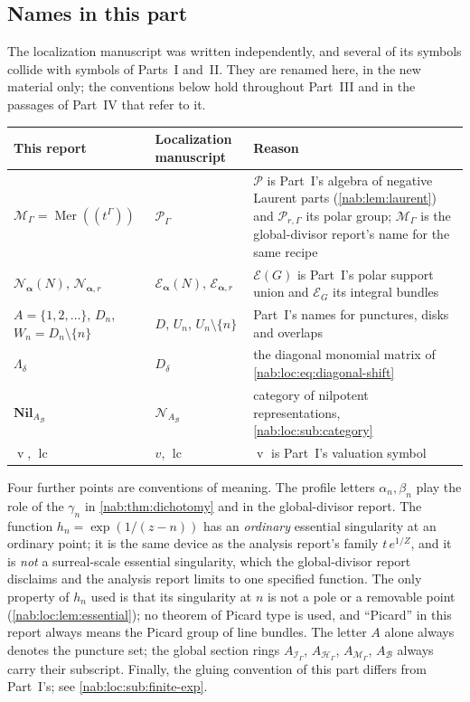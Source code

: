 \documentclass[11pt,letterpaper]{article}
\theoremstyle{definition}
\theoremstyle{remark}
\newcommand{\HH}{\mathscr H_\Gamma}
\newcommand{\II}{\mathscr I_\Gamma}
\newcommand{\val}{\operatorname{v}}
\newcommand{\PP}{\mathcal P}
\newcommand{\EU}{\mathcal E}
\newcommand{\MM}{\mathscr M_\Gamma}
\newcommand{\BB}{\mathscr B}
\newcommand{\Aglob}{A_{\BB}}
\newcommand{\Mer}{\operatorname{Mer}}
\newcommand{\lc}{\operatorname{lc}}
\newcommand{\Nil}{\mathbf{Nil}}
\newcommand{\profile}{\boldsymbol\alpha}
\newcommand{\NN}[1]{\mathcal N_{\profile,#1}}
\numberwithin{equation}{section}
\begin{document}
\subsection{Names in this part}\label{nab:loc:sub:names}

The localization manuscript was written independently, and several of its
symbols collide with symbols of Parts~I and~II. They are renamed here, in the
new material only; the conventions below hold throughout Part~III and in the
passages of Part~IV that refer to it.

\begin{center}\small
\begin{tabular}{@{}L{0.25\textwidth}L{0.2\textwidth}L{0.45\textwidth}@{}}
\toprule
This report & Localization manuscript & Reason\\
\midrule
$\MM=\Mer((t^\Gamma))$ & $\mathscr P_\Gamma$ &
$\PP$ is Part~I's algebra of negative Laurent parts (\cref{nab:lem:laurent})
and $\mathscr P_{r,\Gamma}$ its polar group; $\mathscr M_\Gamma$ is the
global-divisor report's name for the same recipe\\[0.3em]
$\mathcal N_{\profile}(N)$, $\NN r$ & $\mathcal E_{\profile}(N)$,
$\mathcal E_{\profile,r}$ &
$\EU(G)$ is Part~I's polar support union and $\mathcal E_G$ its integral
bundles\\[0.3em]
$A=\{1,2,\ldots\}$, $D_n$, $W_n=D_n\setminus\{n\}$ & $D$, $U_n$,
$U_n\setminus\{n\}$ & Part~I's names for punctures, disks and overlaps\\[0.3em]
$\Lambda_\delta$ & $D_\delta$ & the diagonal monomial matrix of
\eqref{nab:loc:eq:diagonal-shift}\\[0.3em]
$\Nil_{\Aglob}$ & $\mathcal N_{\Aglob}$ & category of nilpotent
representations, \cref{nab:loc:sub:category}\\[0.3em]
$\val$, $\lc$ & $v$, $\operatorname{lc}$ & $\val$ is Part~I's valuation symbol\\
\bottomrule
\end{tabular}
\end{center}

Four further points are conventions of meaning. The profile letters
$\alpha_n,\beta_n$ play the role of the $\gamma_n$ in \cref{nab:thm:dichotomy}
and in the global-divisor report. The function $h_n=\exp(1/(z-n))$ has an
\emph{ordinary} essential singularity at an ordinary point; it is the same
device as the analysis report's family $t\,e^{1/Z}$, and it is \emph{not} a
surreal-scale essential singularity, which the global-divisor report
disclaims and the analysis report limits to one specified function. The only
property of $h_n$ used is that its singularity at $n$ is not a pole or a
removable point (\cref{nab:loc:lem:essential}); no theorem of Picard type is
used, and ``Picard'' in this report always means the Picard group of line
bundles. The letter $A$ alone always denotes the puncture set; the global
section rings $A_{\II}$, $A_{\HH}$, $A_{\MM}$, $\Aglob$ always carry their
subscript. Finally, the gluing convention of this part differs from Part~I's;
see \cref{nab:loc:sub:finite-exp}.
\end{document}
